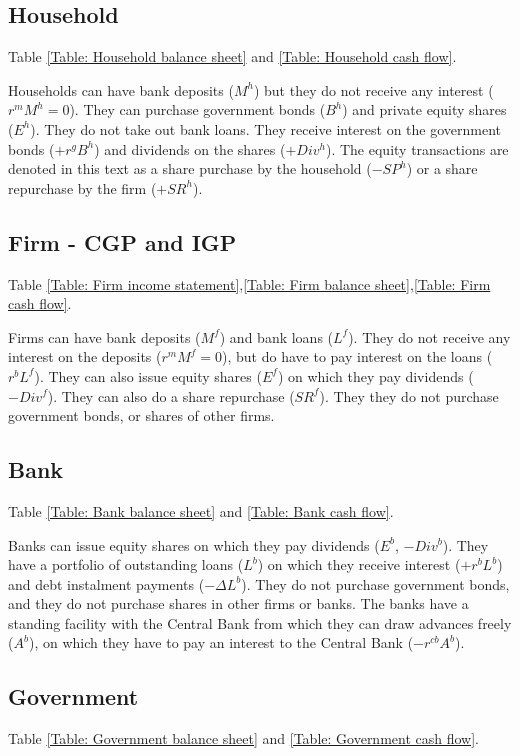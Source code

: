 \subsection{Household}
Table \ref{Table: Household balance sheet} and \ref{Table: Household cash flow}.

Households can have bank deposits ($M^h$) but they do not receive any interest ($r^{m} M^h=0$).
They can purchase government bonds ($B^h$) and private equity shares ($E^h$). They do not take out bank loans. They receive interest on the government bonds ($+r^gB^h$) and dividends on the shares ($+Div^h$). The equity transactions are denoted in this text as a share purchase by the household ($-SP^h$) or a share repurchase by the firm ($+SR^h$).

\subsection{Firm - CGP and IGP}
Table \ref{Table: Firm income statement},\ref{Table: Firm balance sheet},\ref{Table: Firm cash flow}.

Firms can have bank deposits ($M^f$) and bank loans ($L^f$). They do not receive any interest on the deposits ($r^{m} M^f=0$), but do have to pay interest on the loans ($r^b L^f$). They can also issue equity shares ($E^f$) on which they pay dividends ($-Div^f$). They can also do a share repurchase ($SR^f$). They they do not purchase government bonds, or shares of other firms.

\subsection{Bank}
Table \ref{Table: Bank balance sheet} and \ref{Table: Bank cash flow}.

Banks can issue equity shares on which they pay dividends ($E^b$, $-Div^b$). They have a portfolio of outstanding loans ($L^b$) on which they receive interest ($+r^b L^b$) and debt instalment payments ($-\Delta L^b$).
They do not purchase government bonds, and they do not purchase shares in other firms or banks. The banks have a standing facility with the Central Bank from which they can draw advances freely ($A^b$), on which they have to pay an interest to the Central Bank ($-r^{cb}A^b$).

\subsection{Government}
Table \ref{Table: Government balance sheet} and \ref{Table: Government cash flow}.

